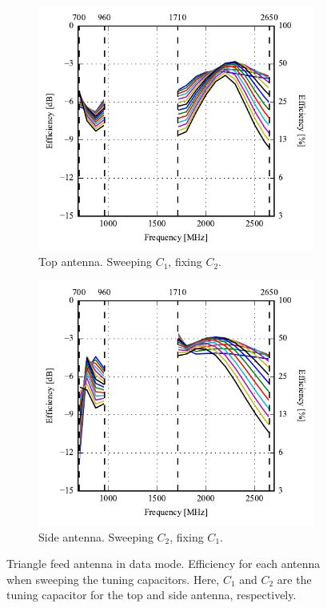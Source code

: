 \begin{figure}[htbp]
    \centering
    \begin{subfigure}{0.49\linewidth}
        \centering
        \includegraphics{img/tech_sol/trianglefeed/data_mode/efficiency-ac1-Csh1.pdf}
        \caption{Top antenna. Sweeping $C_1$, fixing $C_2$.}
    \end{subfigure}
    \hfill
    \begin{subfigure}{0.49\linewidth}
        \centering
        \includegraphics{img/tech_sol/trianglefeed/data_mode/efficiency-ac2-Csh2.pdf}
        \caption{Side antenna. Sweeping $C_2$, fixing $C_1$.}
    \end{subfigure}
    \caption{Triangle feed antenna in data mode. Efficiency for each antenna when sweeping the tuning capacitors. Here, $C_1$ and $C_2$ are the tuning capacitor for the top and side antenna, respectively.}
    \label{fig:eff_sol2data}
\end{figure}


